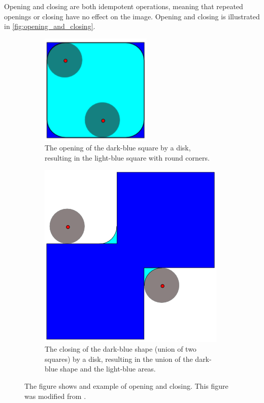 Opening and closing are both idempotent operations, meaning that repeated openings or closing have no effect on the image. Opening and closing is illustrated in \autoref{fig:opening_and_closing}.
\begin{figure}[h]
  \centering
  \begin{subfigure}[t]{0.45\textwidth}
    \centering
    \includegraphics[width=0.5\linewidth]{figures/detection/opening.png}
    \caption{The opening of the dark-blue square by a disk, resulting in the light-blue square with round corners.}
    \label{fig:opening}
  \end{subfigure}
  \quad
  \begin{subfigure}[t]{0.45\textwidth}
    \centering
    \includegraphics[width=0.5\linewidth]{figures/detection/closing.png}
    \caption{The closing of the dark-blue shape (union of two squares) by a disk, resulting in the union of the dark-blue shape and the light-blue areas.}
    \label{fig:closing}
  \end{subfigure}
  \caption{The figure shows and example of opening and closing. This figure was modified from \cite{Renatokeshet_2023}.}
  \label{fig:opening_and_closing}
\end{figure}

